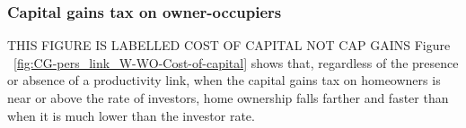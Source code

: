 



\subsubsection{Capital gains tax on owner-occupiers}

{\color{red} THIS FIGURE IS LABELLED COST OF CAPITAL NOT CAP GAINS Figure ~\ref{fig:CG-pers_link_W-WO-Cost-of-capital} } shows that, regardless of the presence or absence of a productivity link, when the capital gains tax on homeowners is near or above the rate of investors, %
home ownership falls farther and faster than when it is much lower than the investor rate. 

